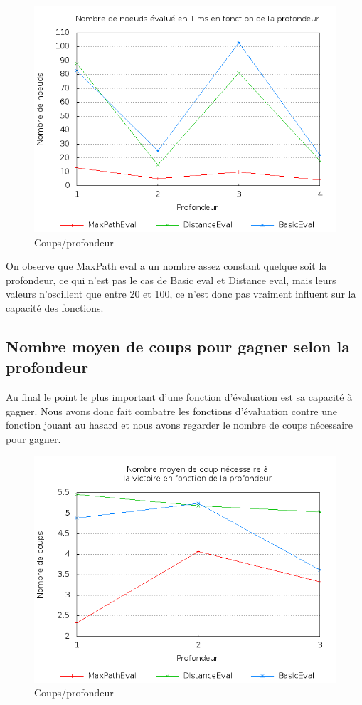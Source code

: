 		\begin{figure}[h!]
			\centering
			\includegraphics[width=\textwidth]{images/ratio.png}
			\caption{Coups/profondeur}
			\label{fig:stats_ratio}
		\end{figure}
		
		On observe que MaxPath eval a un nombre assez constant
		quelque soit la profondeur, ce qui n'est pas le cas de
		Basic eval et Distance eval, mais leurs valeurs n'oscillent
		que entre 20 et 100, ce n'est donc pas vraiment influent
		sur la capacité des fonctions.
	
	\newpage
	\subsection{Nombre moyen de coups pour gagner selon la profondeur}
	
		Au final le point le plus important d'une fonction d'évaluation est
		sa capacité à gagner. Nous avons donc fait combatre les fonctions
		d'évaluation contre une fonction jouant au hasard et nous avons
		regarder le nombre de coups nécessaire pour gagner.
	
		\begin{figure}[h!]
			\centering
			\includegraphics[width=\textwidth]{images/victNbMoves.png}
			\caption{Coups/profondeur}
			\label{fig:stats_nbMovesVict}
		\end{figure}
		
